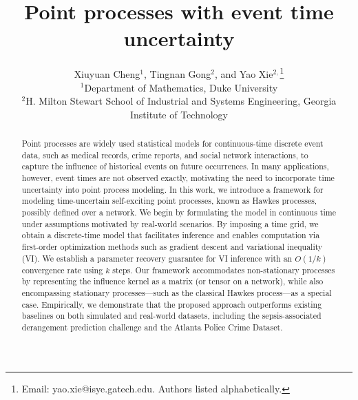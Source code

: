 \documentclass[11pt]{article}
\theoremstyle{remark}
\theoremstyle{plain}
\begin{document}
\title{Point processes with event time uncertainty}


 \author{
 Xiuyuan Cheng$^{1}$,
 Tingnan Gong$^{2}$,   
 and Yao Xie$^{2,}$\thanks{Email: yao.xie@isye.gatech.edu. Authors listed alphabetically.} 
 \vspace{10pt}
 \\
 \small{$^1$Department of Mathematics, Duke University}\\
 \small{$^2$H. Milton Stewart School of Industrial and Systems Engineering, Georgia Institute of Technology} 
 }


\date{\vspace{-30pt}}


\maketitle

\begin{abstract}

Point processes are widely used statistical models for continuous-time discrete event data, such as medical records, crime reports, and social network interactions, to capture the influence of historical events on future occurrences. In many applications, however, event times are not observed exactly, motivating the need to incorporate time uncertainty into point process modeling. In this work, we introduce a framework for modeling time-uncertain self-exciting point processes, known as Hawkes processes, possibly defined over a network. We begin by formulating the model in continuous time under assumptions motivated by real-world scenarios. By imposing a time grid, we obtain a discrete-time model that facilitates inference and enables computation via first-order optimization methods such as gradient descent and variational inequality (VI). We establish a parameter recovery guarantee for VI inference with an $O(1/k)$ convergence rate using $k$ steps. Our framework accommodates non-stationary processes by representing the influence kernel as a matrix (or tensor on a network), while also encompassing stationary processes—such as the classical Hawkes process—as a special case. Empirically, we demonstrate that the proposed approach outperforms existing baselines on both simulated and real-world datasets, including the sepsis-associated derangement prediction challenge and the Atlanta Police Crime Dataset.


\end{abstract}
\end{document}
